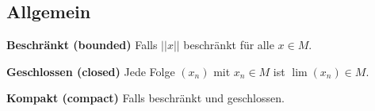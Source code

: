 \subsection{Allgemein}
\textbf{Beschränkt (bounded)} Falls $||x||$ beschränkt für alle $x \in M$.

\textbf{Geschlossen (closed)} Jede Folge $(x_n)$ mit $x_n \in M$ ist $\lim (x_n) \in M$.

\textbf{Kompakt (compact)} Falls beschränkt und geschlossen.